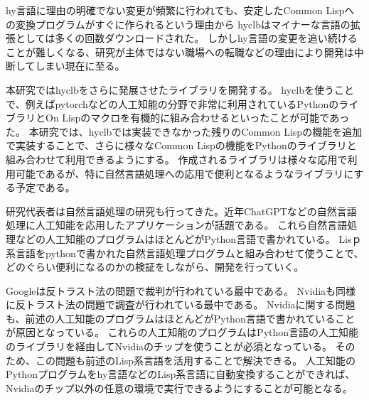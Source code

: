 \documentclass[11pt,a4j,dvipdfmx]{jarticle} 					%
\newcommand{\研究課題名}{人工知能のためのLispシステム}
\newcommand{\研究機関名}{大阪公立大学工業高等専門学校}
\newcommand{\研究代表者氏名}{新妻弘崇}
\newcommand{\研究期間の最終元号年度}{11}  %
\begin{document}
hy言語に理由の明確でない変更が頻繁に行われても、安定したCommon Lispへの変換プログラムがすぐに作られるという理由から
hyclbはマイナーな言語の拡張としては多くの回数ダウンロードされた。
しかしhy言語の変更を追い続けることが難しくなる、研究が主体ではない職場への転職などの理由により開発は中断してしまい現在に至る。


本研究ではhyclbをさらに発展させたライブラリを開発する。
hyclbを使うことで、例えばpytorchなどの人工知能の分野で非常に利用されているPythonのライブラリとOn Lispのマクロを有機的に組み合わせるといったことが可能であった。
本研究では、hyclbでは実装できなかった残りのCommon Lispの機能を追加で実装することで、さらに様々なCommon Lispの機能をPythonのライブラリと組み合わせて利用できるようにする。
作成されるライブラリは様々な応用で利用可能であるが、特に自然言語処理への応用で便利となるようなライブラリにする予定である。

研究代表者は自然言語処理の研究も行ってきた。近年ChatGPTなどの自然言語処理に人工知能を応用したアプリケーションが話題である。
これら自然言語処理などの人工知能のプログラムはほとんどがPython言語で書かれている。
Lisｐ系言語をpythonで書かれた自然言語処理プログラムと組み合わせて使うことで、どのぐらい便利になるのかの検証をしながら、開発を行っていく。


Googleは反トラスト法の問題で裁判が行われている最中である。
Nvidiaも同様に反トラスト法の問題で調査が行われている最中である。
Nvidiaに関する問題も、前述の人工知能のプログラムはほとんどがPython言語で書かれていることが原因となっている。
これらの人工知能のプログラムはPython言語の人工知能のライブラリを経由してNvidiaのチップを使うことが必須となっている。
そのため、この問題も前述のLisp系言語を活用することで解決できる。
人工知能のPythonプログラムをhy言語などのLisp系言語に自動変換することができれば、Nvidiaのチップ以外の任意の環境で実行できるようにすることが可能となる。

\end{document}
